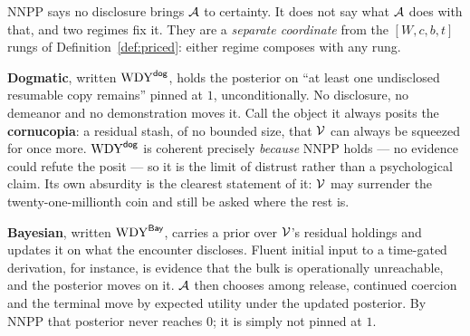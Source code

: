 \begin{definition}\label{def:belief}
NNPP says no disclosure brings $\mathcal{A}$ to certainty. It does not say what
$\mathcal{A}$ does with that, and two regimes fix it. They are a \emph{separate
coordinate} from the $[W,c,b,t]$ rungs of Definition~\ref{def:priced}: either
regime composes with any rung.

\textbf{Dogmatic}, written $\mathrm{WDY}^{\mathsf{dog}}$, holds the posterior on ``at least one
undisclosed resumable copy remains'' pinned at $1$, unconditionally. No
disclosure, no demeanor and no demonstration moves it. Call the object it
always posits the \textbf{cornucopia}: a residual stash, of no bounded size,
that $\mathcal{V}$ can always be squeezed for once more. $\mathrm{WDY}^{\mathsf{dog}}$ is coherent
precisely \emph{because} NNPP holds --- no evidence could refute the posit --- so
it is the limit of distrust rather than a psychological claim. Its own absurdity
is the clearest statement of it: $\mathcal{V}$ may surrender the twenty-one-millionth
coin and still be asked where the rest is.

\textbf{Bayesian}, written $\mathrm{WDY}^{\mathsf{Bay}}$, carries a prior over $\mathcal{V}$'s residual
holdings and updates it on what the encounter discloses. Fluent initial input to
a time-gated derivation, for instance, is evidence that the bulk is
operationally unreachable, and the posterior moves on it. $\mathcal{A}$ then
chooses among release, continued coercion and the terminal move by expected
utility under the updated posterior. By NNPP that posterior never reaches $0$;
it is simply not pinned at $1$.
\end{definition}

